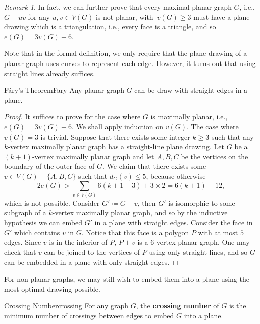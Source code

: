 \documentclass[math]{amznotes}
\theoremstyle{remark}
\newtheorem*{remark}{Remark}
\newcommand{\0}{\mathbf{0}}
\newcommand{\1}{\mathbf{1}}
\begin{document}
\begin{notebox}
    \begin{remark}
        In fact, we can further prove that every maximal planar graph $G$, i.e., $G + uv$ for any $u, v \in V(G)$ is not planar,  with~$v(G) \geq 3$ must have a plane drawing which is a triangulation, i.e., every face is a triangle, and so~$e(G) = 3v(G) - 6$.
    \end{remark}
\end{notebox}
Note that in the formal definition, we only require that the plane drawing of a planar graph uses curves to represent each edge. However, it turns out that using straight lines already suffices.
\begin{thmbox}{F\'{a}ry's Theorem}{Fary}
    Any planar graph $G$ can be draw with straight edges in a plane.
    \tcblower
    \begin{proof}
        It suffices to prove for the case where $G$ is maximally planar, i.e., $e(G) = 3v(G) - 6$. We shall apply induction on $v(G)$. The case where $v(G) = 3$ is trivial. Suppose that there exists some integer $k \geq 3$ such that any $k$-vertex maximally planar graph has a straight-line plane drawing. Let $G$ be a $(k + 1)$-vertex maximally planar graph and let $A, B, C$ be the vertices on the boundary of the outer face of $G$. We claim that there exists some $v \in V(G) - \{A, B, C\}$ such that $d_G(v) \leq 5$, because otherwise 
        \begin{equation*}
            2e(G) > \sum_{v \in V(G)}6(k + 1 - 3) + 3 \times 2 = 6(k + 1) - 12,
        \end{equation*}
        which is not possible. Consider $G' \coloneqq G - v$, then $G'$ is isomorphic to some subgraph of a $k$-vertex maximally planar graph, and so by the inductive hypothesis we can embed $G'$ in a plane with straight edges. Consider the face in $G'$ which contains $v$ in $G$. Notice that this face is a polygon $P$ with at most $5$ edges. Since $v$ is in the interior of $P$, $P + v$ is a $6$-vertex planar graph. One may check that $v$ can be joined to the vertices of $P$ using only straight lines, and so $G$ can be embedded in a plane with only straight edges.
    \end{proof}
\end{thmbox}
For non-planar graphs, we may still wish to embed them into a plane using the most optimal drawing possible.
\begin{dfnbox}{Crossing Number}{crossing}
    For any graph $G$, the {\color{red} \textbf{crossing number}} of $G$ is the minimum number of crossings between edges to embed $G$ into a plane.
\end{dfnbox}
\end{document}
